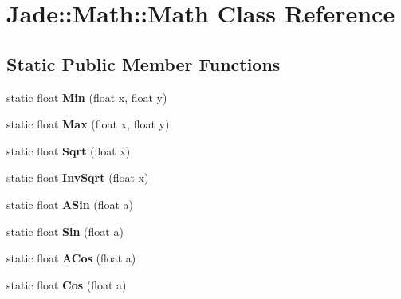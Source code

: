 \hypertarget{class_jade_1_1_math_1_1_math}{}\section{Jade\+:\+:Math\+:\+:Math Class Reference}
\label{class_jade_1_1_math_1_1_math}
\subsection*{Static Public Member Functions}
\begin{DoxyCompactItemize}
\item 
\hypertarget{class_jade_1_1_math_1_1_math_aa3bdd4851ec832772ad60b305bf65d59}{}static float {\bfseries Min} (float x, float y)\label{class_jade_1_1_math_1_1_math_aa3bdd4851ec832772ad60b305bf65d59}

\item 
\hypertarget{class_jade_1_1_math_1_1_math_a7987b2173867b9b819f7c45885f5d82c}{}static float {\bfseries Max} (float x, float y)\label{class_jade_1_1_math_1_1_math_a7987b2173867b9b819f7c45885f5d82c}

\item 
\hypertarget{class_jade_1_1_math_1_1_math_a551d0bcc4301eb52c19634cc953c8cff}{}static float {\bfseries Sqrt} (float x)\label{class_jade_1_1_math_1_1_math_a551d0bcc4301eb52c19634cc953c8cff}

\item 
\hypertarget{class_jade_1_1_math_1_1_math_ad41fbf7624c853027b90901945f4c9f7}{}static float {\bfseries Inv\+Sqrt} (float x)\label{class_jade_1_1_math_1_1_math_ad41fbf7624c853027b90901945f4c9f7}

\item 
\hypertarget{class_jade_1_1_math_1_1_math_a3ee50eb9d237aeeb6a90ea0d60cc499d}{}static float {\bfseries A\+Sin} (float a)\label{class_jade_1_1_math_1_1_math_a3ee50eb9d237aeeb6a90ea0d60cc499d}

\item 
\hypertarget{class_jade_1_1_math_1_1_math_a863e6bcc5d3100fc23d18ac6a6cc1233}{}static float {\bfseries Sin} (float a)\label{class_jade_1_1_math_1_1_math_a863e6bcc5d3100fc23d18ac6a6cc1233}

\item 
\hypertarget{class_jade_1_1_math_1_1_math_a5157d7c0f20fd993d698af51fb8d82a8}{}static float {\bfseries A\+Cos} (float a)\label{class_jade_1_1_math_1_1_math_a5157d7c0f20fd993d698af51fb8d82a8}

\item 
\hypertarget{class_jade_1_1_math_1_1_math_a3ba179503e6682f8d8411f2da7986af0}{}static float {\bfseries Cos} (float a)\label{class_jade_1_1_math_1_1_math_a3ba179503e6682f8d8411f2da7986af0}


\end{DoxyCompactItemize}
